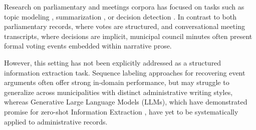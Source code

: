 \documentclass[11pt]{article}
\begin{document}
Research on parliamentary and meetings corpora has focused on tasks such as topic modeling \cite{Erjavec2023-parlamentary-ner}, summarization \cite{hu-etal-2023-meetingbank,2022-elitr}, or decision detection \cite{AMI_meeting_corpus}. In contrast to both parliamentary records, where votes are structured, and conversational meeting transcripts, where decisions are implicit, municipal council minutes often present formal voting events embedded within narrative prose. 
 

However, this setting has not been explicitly addressed as a structured information extraction task. Sequence labeling approaches for recovering event arguments often offer strong in-domain performance, but may struggle to generalize across municipalities with distinct administrative writing styles, whereas Generative Large Language Models (LLMs), which have demonstrated promise for zero-shot Information Extraction \cite{wadhwa-etal-2023-revisiting, xu_large_2024}, have yet to be systematically applied to administrative records.



\end{document}
